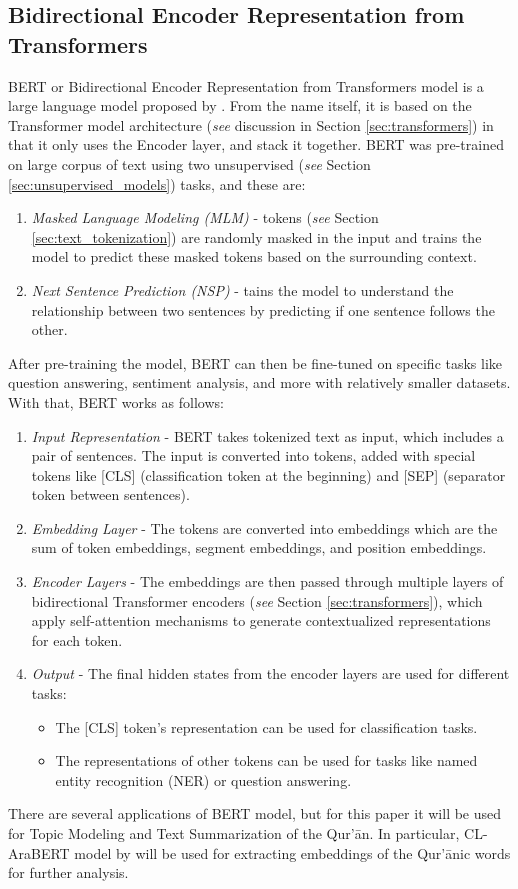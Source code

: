 \subsection{Bidirectional Encoder Representation from Transformers}
BERT or Bidirectional Encoder Representation from Transformers model is a large language model proposed by . From the name itself, it is based on the Transformer model architecture (\textit{see} discussion in Section \ref{sec:transformers}) in that it only uses the Encoder layer, and stack it together. BERT was pre-trained on large corpus of text using two unsupervised (\textit{see} Section \ref{sec:unsupervised_models}) tasks, and these are:
\begin{enumerate}
    \item \textit{Masked Language Modeling (MLM)} - tokens (\textit{see} Section \ref{sec:text_tokenization}) are randomly masked in the input and trains the model to predict these masked tokens based on the surrounding context.
    \item \textit{Next Sentence Prediction (NSP)} - tains the model to understand the relationship between two sentences by predicting if one sentence follows the other.
\end{enumerate}
After pre-training the model, BERT can then be fine-tuned on specific tasks like question answering, sentiment analysis, and more with relatively smaller datasets. With that, BERT works as follows: 
\begin{enumerate}
    \item \textit{Input Representation} - BERT takes tokenized text as input, which includes a pair of sentences. The input is converted into tokens, added with special tokens like [CLS] (classification token at the beginning) and [SEP] (separator token between sentences).
    \item \textit{Embedding Layer} - The tokens are converted into embeddings which are the sum of token embeddings, segment embeddings, and position embeddings.
    \item \textit{Encoder Layers} - The embeddings are then passed through multiple layers of bidirectional Transformer encoders (\textit{see} Section \ref{sec:transformers}), which apply self-attention mechanisms to generate contextualized representations for each token.
    \item \textit{Output} - The final hidden states from the encoder layers are used for different tasks:
    \begin{itemize}
        \item The [CLS] token’s representation can be used for classification tasks.
        \item The representations of other tokens can be used for tasks like named entity recognition (NER) or question answering.
    \end{itemize}
\end{enumerate}
There are several applications of BERT model, but for this paper it will be used for Topic Modeling and Text Summarization of the Qur'\=an. In particular, CL-AraBERT model by will be used for extracting embeddings of the Qur'\=anic words for further analysis.
